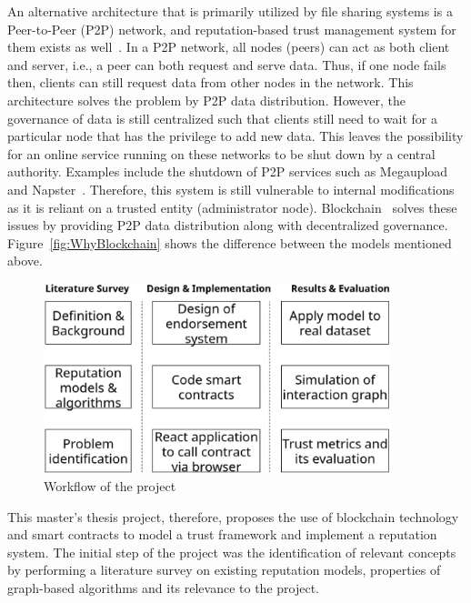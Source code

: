 An alternative architecture that is primarily utilized by file sharing systems
is a Peer-to-Peer (P2P) network, and reputation-based trust management system
for them exists as well~\cite{selcuk2004reputation}. In a P2P network, all
nodes (peers) can act as both client and server, i.e., a peer can both request
and serve data. Thus, if one node fails then, clients can still request data
from other nodes in the network. This architecture solves the problem by P2P
data distribution. However, the governance of data is still centralized such
that clients still need to wait for a particular node that has the privilege to
add new data. This leaves the possibility for an online service running on
these networks to be shut down by a central authority.  Examples include the
shutdown of P2P services such as Megaupload~\cite{kang2012megaupload}  and
Napster~\cite{stern2000napster}. Therefore, this system is still vulnerable to
internal modifications as it is reliant on a trusted entity (administrator
node). Blockchain~\cite{atzori2015blockchain} solves these issues by providing
P2P data distribution along with decentralized governance.
Figure~\ref{fig:WhyBlockchain} shows the difference between the models
mentioned above. \\
\begin{figure}
	\begin{center}
		\includegraphics[width=0.9\textwidth]{Images/workflow.eps}
		\caption{Workflow of the project}
		\label{fig:thesisSteps}
	\end{center}
\end{figure}
This master's thesis project, therefore, proposes the use of blockchain
technology and smart contracts to model a trust framework and implement a
reputation system. The initial step of the project was the identification of
relevant concepts by performing a literature survey on existing reputation
models, properties of graph-based algorithms and its relevance to the project.
